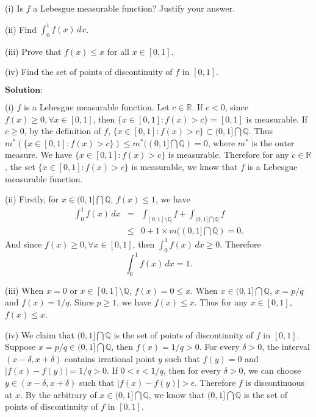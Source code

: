 \documentclass[12pt,a4paper]{ctexart}
\begin{document}
(i) Is $f$ a Lebesgue measurable function? Justify your answer.

(ii) Find $\int_{0}^{1} f(x) \, d x$.

(iii) Prove that $f(x) \leq x$ for all $x \in [0,1]$.

(iv) Find the set of points of discontinuity of $f$ in $[0,1]$.

\vspace{8pt}
$\textbf{Solution:}$

(i) $f$ is a Lebesgue measurable function. Let $c \in \mathbb R$. If $c < 0$, since $f(x) \geq 0, \forall x \in [0,1]$, then $\{x \in [0,1] : f(x) > c\} = [0,1]$ is measurable. If $c \geq 0$, by the definition of $f$, $\{x \in [0,1] : f(x) > c\} \subset (0,1] \bigcap \mathbb Q$. Thus $m^{*}(\{x \in [0,1]: f(x) > c \}) \leq m^{*}((0,1] \bigcap \mathbb Q) = 0$, where $m^{*}$ is the outer measure. We have $\{x \in [0,1]: f(x) > c\}$ is measurable. Therefore for any $c \in \mathbb R$, the set $\{x \in [0,1]: f(x) > c\}$ is measurable, we know that $f$ is a Lebesgue measurable function.

\vspace{6pt}

(ii) Firstly, for $x \in (0,1] \bigcap \mathbb Q$, $f(x) \leq 1$,  we have
\begin{eqnarray*}
    \int_{0}^{1} f(x)\, d x & = & \int_{[0,1] \setminus \mathbb Q} f + \int_{(0,1] \bigcap \mathbb Q} f \\
    & \leq & 0 + 1 \times m((0,1] \bigcap \mathbb Q) = 0.
\end{eqnarray*}
And since $f(x) \geq 0, \forall x \in [0,1]$, then $\int_{0}^{1} f(x) \, d x \geq 0$. Therefore
\begin{equation*}
    \int_{0}^{1} f(x) \, d x = 1.
\end{equation*}

\vspace{6pt}

(iii) When $x = 0$ or $x \in [0,1] \setminus \mathbb Q$, $f(x) = 0 \leq x$. When $x \in (0,1] \bigcap \mathbb Q$, $x = p/q$ and $f(x) = 1/q$. Since $p \geq 1$, we have $f(x) \leq x$. Thus for any $x \in [0,1]$, $f(x) \leq x$.

\vspace{6pt}

(iv) We claim that $(0,1] \bigcap \mathbb Q$ is the set of points of discontinuity of $f$ in $[0,1]$. Suppose $x = p/q \in (0,1] \bigcap \mathbb Q$, then $f(x) = 1/q > 0$. For every $\delta > 0$, the interval $(x-\delta, x+\delta)$ contains irrational point $y$ such that $f(y) = 0$ and $|f(x) - f(y)| = 1/q > 0$. If $0 < \epsilon < 1/q$, then for every $\delta > 0$, we can choose $y \in (x - \delta, x + \delta)$ such that $|f(x) - f(y)| > \epsilon$. Therefore $f$ is discontinuous at $x$. By the arbitrary of $x \in (0,1] \bigcap \mathbb Q$, we know that $(0,1] \bigcap \mathbb Q$ is the set of points of discontinuity of $f$ in $[0,1]$.
\end{document}
